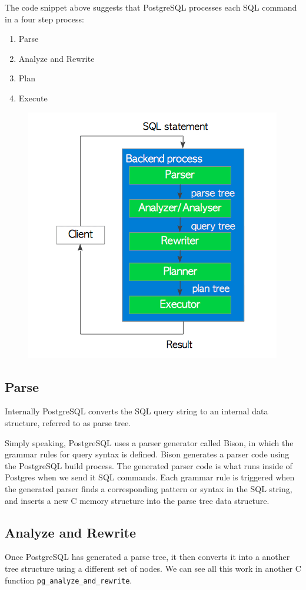 \documentclass[runningheads]{llncs}
\begin{document}
The code snippet above suggests that PostgreSQL processes each SQL command in a four step process:
\begin{enumerate}
\item Parse
\item Analyze and Rewrite
\item Plan
\item Execute
\end{enumerate}

\begin{figure}
    \includegraphics[scale=0.5,center]{images/query_processing.png}
\end{figure}


\subsection{Parse}
Internally PostgreSQL converts the SQL query string to an internal data structure, referred to as parse tree.

Simply speaking, PostgreSQL uses  a parser generator called Bison, in which the grammar rules for query syntax is defined. Bison generates a parser code using the PostgreSQL build process. The generated parser code is what runs inside of Postgres when we send it SQL commands. Each grammar rule is triggered when the generated parser finds a corresponding pattern or syntax in the SQL string, and inserts a new C memory structure into the parse tree data structure.

\subsection{Analyze and Rewrite}
Once PostgreSQL has generated a parse tree, it then converts it into a another tree structure using a different set of nodes. We can see all this work in another C function \texttt{pg\_analyze\_and\_rewrite}.
\end{document}
